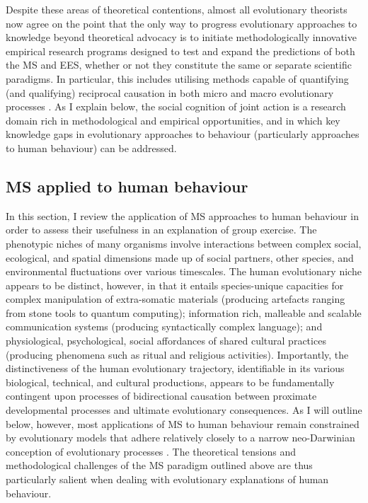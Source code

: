 Despite these areas of theoretical contentions, almost all evolutionary theorists now agree on the point that the only way to progress evolutionary approaches to knowledge beyond theoretical advocacy is to initiate methodologically innovative empirical research programs designed to test and expand the predictions of both the MS and EES, whether or not they constitute the same or separate scientific paradigms.  In particular, this includes utilising methods capable of quantifying (and qualifying) reciprocal causation in both micro and macro evolutionary processes  \citep{Wray2014,Laland2014,Laland2015,Svensson2017}.  As I explain below, the social cognition of joint action is a research domain rich in methodological and empirical opportunities, and in which key knowledge gaps in evolutionary approaches to behaviour (particularly approaches to human behaviour) can be addressed.


  \subsection{MS applied to human behaviour}
In this section, I review the application of MS approaches to human behaviour in order to assess their usefulness in an explanation of group exercise.  The phenotypic niches of many organisms involve interactions between complex social, ecological, and spatial dimensions made up of social partners, other species, and environmental fluctuations over various timescales. The human evolutionary niche appears to be distinct, however, in that it entails species-unique capacities for complex manipulation of extra-somatic materials (producing artefacts ranging from stone tools to quantum computing); information rich, malleable and scalable communication systems (producing syntactically complex language); and physiological, psychological, social affordances of shared cultural practices (producing phenomena such as ritual and religious activities). Importantly, the distinctiveness of the human evolutionary trajectory, identifiable in its various biological, technical, and cultural productions, appears to be fundamentally contingent upon processes of bidirectional causation between proximate developmental processes and ultimate evolutionary consequences.  As I will outline below, however,
most applications of MS to human behaviour remain constrained by evolutionary models that adhere relatively closely to a narrow neo-Darwinian conception of evolutionary processes \citep{Claidiere2014,Mesoudi2017}.  The theoretical tensions and methodological challenges of the MS paradigm outlined above are thus particularly salient when dealing with evolutionary explanations of human behaviour.


